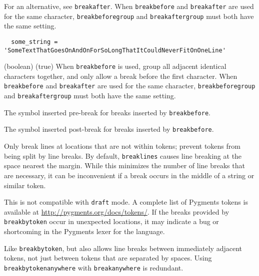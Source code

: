 \begin{optionlist}
 For an alternative, see \texttt{breakafter}.  When \texttt{breakbefore} and \texttt{breakafter} are used for the same character, \texttt{breakbeforegroup} and \texttt{breakaftergroup} must both have the same setting.

\begin{longexample}
  \begin{verbatim}
  some_string = 'SomeTextThatGoesOnAndOnForSoLongThatItCouldNeverFitOnOneLine'
  \end{verbatim}
\end{longexample}

  \item[breakbeforegroup] (boolean) (true)
    When \texttt{breakbefore} is used, group all adjacent identical characters together, and only allow a break before the first character.  When \texttt{breakbefore} and \texttt{breakafter} are used for the same character, \texttt{breakbeforegroup} and \texttt{breakaftergroup} must both have the same setting.

  \item[breakbeforesymbolpre (string) (\string\,\string\footnotesize\string\ensuremath\{\_\string\rfloor\}, \,\footnotesize\ensuremath{_\rfloor})]
    The symbol inserted pre-break for breaks inserted by \texttt{breakbefore}.

  \item[breakbeforesymbolpost (string) (\meta{none})]
    The symbol inserted post-break for breaks inserted by \texttt{breakbefore}.

  \item[breakbytoken (boolean) (false)]
  Only break lines at locations that are not within tokens; prevent tokens from being split by line breaks.  By default, \texttt{breaklines} causes line breaking at the space nearest the margin.  While this minimizes the number of line breaks that are necessary, it can be inconvenient if a break occurs in the middle of a string or similar token.

  This is not compatible with \texttt{draft} mode.  A complete list of Pygments tokens is available at \url{http://pygments.org/docs/tokens/}.  If the breaks provided by \texttt{breakbytoken} occur in unexpected locations, it may indicate a bug or shortcoming in the Pygments lexer for the language.

  \item[breakbytokenanywhere (boolean) (false)] 
  Like \texttt{breakbytoken}, but also allows line breaks between immediately adjacent tokens, not just between tokens that are separated by spaces.  Using \texttt{breakbytokenanywhere} with \texttt{breakanywhere} is redundant.


\end{optionlist}
